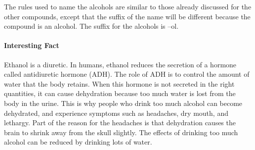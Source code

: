 The rules used to name the alcohols are similar to those already discussed for the other compounds, except that the suffix of the name will be different because the compound is an alcohol. The suffix for the alcohols is --ol.


\paragraph{Interesting Fact}
Ethanol is a diuretic. In humans, ethanol reduces the secretion of a hormone called antidiuretic hormone (ADH). The role of ADH is to control the amount of water that the body retains. When this hormone is not secreted in the right quantities, it can cause dehydration because too much water is lost from the body in the urine. This is why people who drink too much alcohol can become dehydrated, and experience symptoms such as headaches, dry mouth, and lethargy. Part of the reason for the headaches is that dehydration causes the brain to shrink away from the skull slightly. The effects of drinking too much alcohol can be reduced by drinking lots of water.

\newpage

